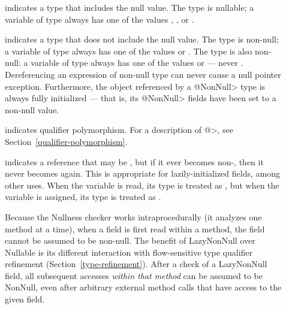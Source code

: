 \begin{description}

\item[]
  indicates a type that includes the null value.  The type 
  is nullable; a variable of type  always has one of the
  values , , or .

\item[]
  indicates a type that does not include the null value.  The type
   is non-null; a variable of type  always has
  one of the values  or .  The type  is also non-null:  a variable of type 
  always has one of the values  or  --- never
  .  Dereferencing an expression of non-null type can never cause
  a null pointer exception.
  Furthermore, the object referenced by a \<@NonNull> type is always fully
  initialized --- that is, its \<@NonNull> fields have been set to a
  non-null value.

\item[]
  indicates qualifier polymorphism.  For a description of
  \<@>, see
  Section~\ref{qualifier-polymorphism}.

\item[]
  indicates a reference that may be , but if it ever becomes
  non-, then it never becomes  again.  This is
  appropriate for lazily-initialized fields, among other uses.  When the
  variable is read, its type is treated as
  , but when the variable is
  assigned, its type is treated as
  .

  Because the Nullness checker works intraprocedurally (it analyzes one
  method at a time), when a  field is first read within a
  method, the field cannot be assumed to be non-null.  The benefit of
  LazyNonNull over Nullable is its different interaction with
  flow-sensitive type qualifier refinement (Section~\ref{type-refinement}).
  After a check of a LazyNonNull
  field, all subsequent accesses \emph{within that method} can be assumed
  to be NonNull, even after arbitrary external method calls that have
  access to the given field.

\end{description}

